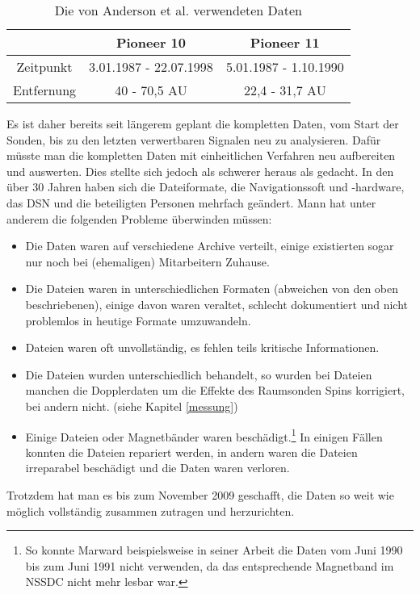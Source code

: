 \begin{table}[ht]
\centering
\begin{tabular}{|c|c|c|}
\hline & Pioneer 10 & Pioneer 11 \\ 
\hline Zeitpunkt & 3.01.1987 - 22.07.1998  & 5.01.1987 - 1.10.1990 \\ 
\hline Entfernung & 40 - 70,5 AU & 22,4 - 31,7 AU \\ 
\hline 
\end{tabular}
\caption{Die von Anderson et al. verwendeten Daten}
\label{tab:andersondaten}
\end{table}


Es ist daher bereits seit längerem geplant die kompletten Daten, vom Start der Sonden, bis zu den letzten verwertbaren Signalen neu zu analysieren. Dafür müsste man die kompletten Daten mit einheitlichen Verfahren neu aufbereiten und auswerten. Dies stellte sich jedoch als schwerer heraus als gedacht. In den über 30 Jahren haben sich die Dateiformate, die Navigationssoft und -hardware, das DSN und die beteiligten Personen mehrfach geändert. Mann hat unter anderem die folgenden Probleme überwinden müssen:\cite{Turyshev2010}
\begin{itemize}
\item Die Daten waren auf verschiedene Archive verteilt, einige existierten sogar nur noch bei (ehemaligen) Mitarbeitern Zuhause.
\item Die Dateien waren in unterschiedlichen Formaten (abweichen von den oben beschriebenen), einige davon waren veraltet, schlecht dokumentiert und nicht problemlos in heutige Formate umzuwandeln.
\item Dateien waren oft unvollständig, es fehlen teils kritische Informationen.
\item Die Dateien wurden unterschiedlich behandelt, so wurden bei Dateien manchen die Dopplerdaten um die Effekte des Raumsonden Spins korrigiert, bei andern nicht. (siehe Kapitel \ref{messung})
\item Einige Dateien oder Magnetbänder waren beschädigt.\footnote{So konnte Marward beispielsweise in seiner Arbeit die Daten vom Juni 1990 bis zum Juni 1991 nicht verwenden, da das entsprechende Magnetband im NSSDC nicht mehr lesbar war.\cite{Markwardt2002}} In einigen Fällen konnten die Dateien repariert werden, in andern waren die Dateien irreparabel beschädigt und die Daten waren verloren.
\end{itemize}
Trotzdem hat man es bis zum November 2009 geschafft, die Daten so weit wie möglich vollständig zusammen zutragen und herzurichten.
